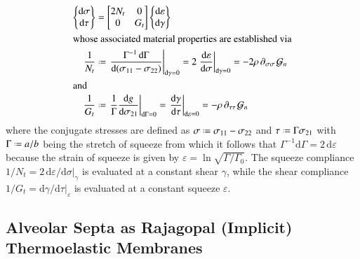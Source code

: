 \begin{subequations}
    \begin{align}
    \left\{ \begin{matrix}
    \mathrm{d} \sigma \\ \mathrm{d} \tau
    \end{matrix} \right\}
    & = \begin{bmatrix}
    2 N_t & 0 \\ 
    0 & G_t
    \end{bmatrix} 
    \left\{ \begin{matrix}  
    \mathrm{d} \varepsilon \\ \mathrm{d} \gamma
    \end{matrix} \right\} \\
    \intertext{whose associated material properties are established via}
    \frac{1}{N_t} & \defeq \left.
    \frac{\Gamma^{-1} \, \mathrm{d}\Gamma}
    {\mathrm{d} (\sigma_{11} - \sigma_{22})} \right|_{\mathrm{d}\gamma = 0} = 
    2 \left. \frac{\mathrm{d} \varepsilon}{\mathrm{d} \sigma} \right|_{\mathrm{d}\gamma = 0} = -2 \rho \, \partial_{\sigma\sigma\,} \mathcal{G}_n 
    \label{squeezeModulus} \\
    \intertext{and}
    \frac{1}{G_t} & \defeq \left. \frac{1}{\Gamma}
    \frac{\mathrm{d}g}{\mathrm{d} \sigma_{21}} 
    \right|_{\mathrm{d} \Gamma = 0} = \left.
    \frac{\mathrm{d} \gamma}{\mathrm{d} \tau} \right|_{\mathrm{d}\varepsilon = 0} = -\rho \, \partial_{\tau\tau\,} \mathcal{G}_n 
    \label{shearModulus}
    \end{align}
\end{subequations}
where the conjugate stresses are defined as $\sigma \defeq \sigma_{11} - \sigma_{22}$ and $\tau \defeq \Gamma \sigma_{21}$ with $\Gamma \defeq a/b$ being the stretch of squeeze from which it follows that $\Gamma^{-1} \mathrm{d} \Gamma = 2 \, \mathrm{d} \varepsilon$ because the strain of squeeze is given by $\varepsilon = \ln \sqrt{ \Gamma / \Gamma_0 }$.  The squeeze compliance $1/N_t = 2 \, \mathrm{d} \varepsilon / \mathrm{d} \sigma |_{\gamma}$ is evaluated at a constant shear $\gamma$, while the shear compliance $1/G_t = \mathrm{d} \gamma / \mathrm{d} \tau |_{\varepsilon}$ is evaluated at a constant squeeze $\varepsilon$.

\subsection{Alveolar Septa as Rajagopal (Implicit) Thermoelastic Membranes}

